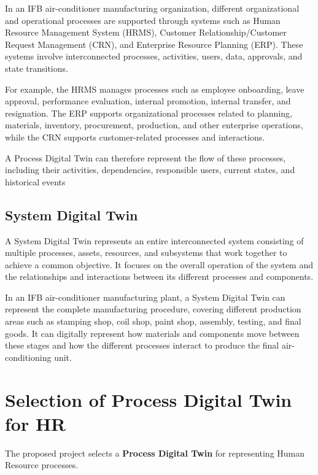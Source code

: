 \documentclass[12pt,a4paper]{article}
\begin{document}
In an IFB air-conditioner manufacturing organization, different organizational and operational processes are supported through systems such as Human Resource Management System (HRMS), Customer Relationship/Customer Request Management (CRN), and Enterprise Resource Planning (ERP). These systems involve interconnected processes, activities, users, data, approvals, and state transitions.

For example, the HRMS manages processes such as employee onboarding, leave approval, performance evaluation, internal promotion, internal transfer, and resignation. The ERP supports organizational processes related to planning, materials, inventory, procurement, production, and other enterprise operations, while the CRN supports customer-related processes and interactions.

A Process Digital Twin can therefore represent the flow of these processes, including their activities, dependencies, responsible users, current states, and historical events

\subsection{System Digital Twin}

A System Digital Twin represents an entire interconnected system consisting of multiple processes, assets, resources, and subsystems that work together to achieve a common objective. It focuses on the overall operation of the system and the relationships and interactions between its different processes and components.

In an IFB air-conditioner manufacturing plant, a System Digital Twin can represent the complete manufacturing procedure, covering different production areas such as stamping shop, coil shop, paint shop, assembly, testing, and final goods. It can digitally represent how materials and components move between these stages and how the different processes interact to produce the final air-conditioning unit.



\section{Selection of Process Digital Twin for HR}

The proposed project selects a \textbf{Process Digital Twin} for
representing Human Resource processes.
\end{document}
